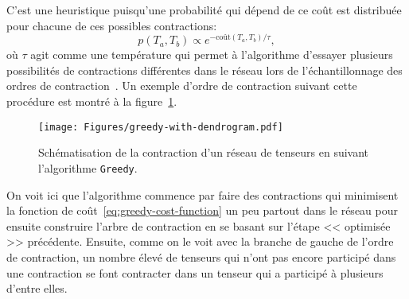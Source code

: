 C'est une heuristique puisqu'une probabilité qui dépend de ce coût est distribuée pour chacune de ces possibles contractions:
\begin{equation}
    p(T_a, T_b) \propto e^{-\mathrm{coût}(T_a, T_b)/\tau},
\end{equation}
où $\tau$ agit comme une température qui permet à l'algorithme d'essayer plusieurs possibilités de contractions différentes dans le réseau lors de l'échantillonnage des ordres de contraction~\cite{gray_hyper-optimized_2021}.
Un exemple d'ordre de contraction suivant cette procédure est montré à la figure~\ref{fig:greedy-with-dendrogram}.
\begin{figure}[h!]
    \centering
    \texttt{[image: Figures/greedy-with-dendrogram.pdf]}
    \caption[Schématisation de la contraction d'un réseau de tenseurs (\texttt{Greedy}).]{Schématisation de la contraction d'un réseau de tenseurs en suivant l'algorithme \texttt{Greedy}.}
    \label{fig:greedy-with-dendrogram}
\end{figure}
On voit ici que l'algorithme commence par faire des contractions qui minimisent la fonction de coût~\ref{eq:greedy-cost-function} un peu partout dans le réseau pour ensuite construire l'arbre de contraction en se basant sur l'étape << optimisée >> précédente.
Ensuite, comme on le voit avec la branche de gauche de l'ordre de contraction, un nombre élevé de tenseurs qui n'ont pas encore participé dans une contraction se font contracter dans un tenseur qui a participé à plusieurs d'entre elles.

